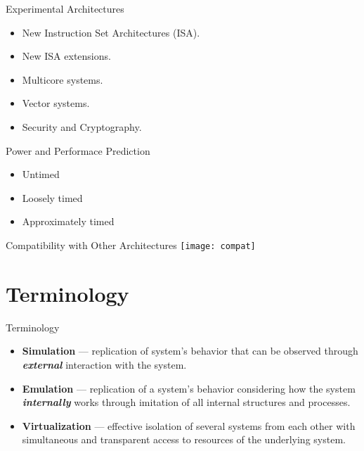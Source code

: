 \begin{frame}{Experimental Architectures}

\begin{itemize}
\item New Instruction Set Architectures (ISA).
\item New ISA extensions.
\item Multicore systems.
\item Vector systems.
\item Security and Cryptography.
\end{itemize}

\end{frame}

\begin{frame}{Power and Performace Prediction}

\begin{itemize}
\item Untimed
\item Loosely timed
\item Approximately timed
\end{itemize}

\end{frame}

\begin{frame}{Compatibility with Other Architectures}
\texttt{[image: compat]} %
\end{frame}

\section{Terminology}

\begin{frame}{Terminology}
\begin{itemize}
\item \textbf{Simulation} --- replication of system's behavior that can be
      observed through \textbf{\textit{external}} interaction with the system.
\item \textbf{Emulation} --- replication of a system's behavior considering how
      the system \textbf{\textit{internally}} works through imitation of all
      internal structures and processes.
\item \textbf{Virtualization} --- effective isolation of several systems from
      each other with simultaneous and transparent access to resources of the
      underlying system.
\end{itemize}

\end{frame}

